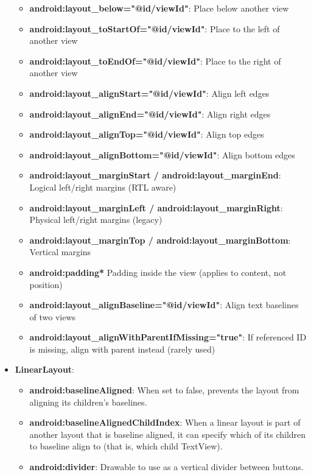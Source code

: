 \documentclass{report}
\begin{document}
\begin{itemize}
\begin{itemize}
                \item \textbf{android:layout\_below="@id/viewId"}:	Place below another view
                \item \textbf{android:layout\_toStartOf="@id/viewId"}:	Place to the left of another view
                \item \textbf{android:layout\_toEndOf="@id/viewId"}:	Place to the right of another view
                \item \textbf{android:layout\_alignStart="@id/viewId"}:	Align left edges
                \item \textbf{android:layout\_alignEnd="@id/viewId"}:	Align right edges
                \item \textbf{android:layout\_alignTop="@id/viewId"}:	Align top edges
                \item \textbf{android:layout\_alignBottom="@id/viewId"}:	Align bottom edges
                \item \textbf{android:layout\_marginStart / android:layout\_marginEnd}:	Logical left/right margins (RTL aware)
                \item \textbf{android:layout\_marginLeft / android:layout\_marginRight}:	Physical left/right margins (legacy)
                \item \textbf{android:layout\_marginTop / android:layout\_marginBottom}:	Vertical margins
                \item \textbf{android:padding*}	Padding inside the view (applies to content, not position)
                \item \textbf{android:layout\_alignBaseline="@id/viewId"}:	Align text baselines of two views
                \item \textbf{android:layout\_alignWithParentIfMissing="true"}:	If referenced ID is missing, align with parent instead (rarely used)
            \end{itemize}
        \item \textbf{LinearLayout}:
            \begin{itemize}
                \item \textbf{android:baselineAligned}:	When set to false, prevents the layout from aligning its children's baselines. 
                \item \textbf{android:baselineAlignedChildIndex}:	When a linear layout is part of another layout that is baseline aligned, it can specify which of its children to baseline align to (that is, which child TextView). 
                \item \textbf{android:divider}:	Drawable to use as a vertical divider between buttons. 

\end{itemize}
\end{itemize}
\end{document}
